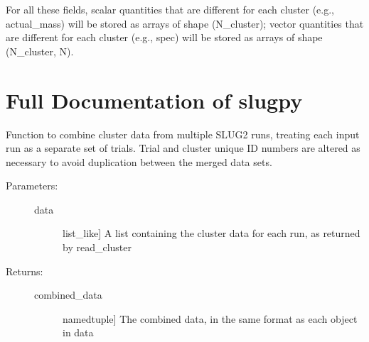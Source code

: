 \documentclass[letterpaper,10pt,english]{sphinxmanual}
\begin{document}
For all these fields, scalar quantities that are different for each cluster (e.g., actual\_mass) will be stored as arrays of shape (N\_cluster); vector quantities that are different for each cluster (e.g., spec) will be stored as arrays of shape (N\_cluster, N).


\section{Full Documentation of slugpy}
\label{slugpy:module-slugpy}\label{slugpy:full-documentation-of-slugpy}

\begin{fulllineitems}
\label{slugpy:slugpy.combine_cluster}
Function to combine cluster data from multiple SLUG2 runs,
treating each input run as a separate set of trials. Trial and
cluster unique ID numbers are altered as necessary to avoid
duplication between the merged data sets.
\begin{description}
\item[{Parameters:}] \leavevmode\begin{description}
\item[{data}] \leavevmode{[}list\_like{]}
A list containing the cluster data for each run, as
returned by read\_cluster

\end{description}

\item[{Returns:}] \leavevmode\begin{description}
\item[{combined\_data}] \leavevmode{[}namedtuple{]}
The combined data, in the same format as each object in data

\end{description}

\end{description}

\end{fulllineitems}

\end{document}
